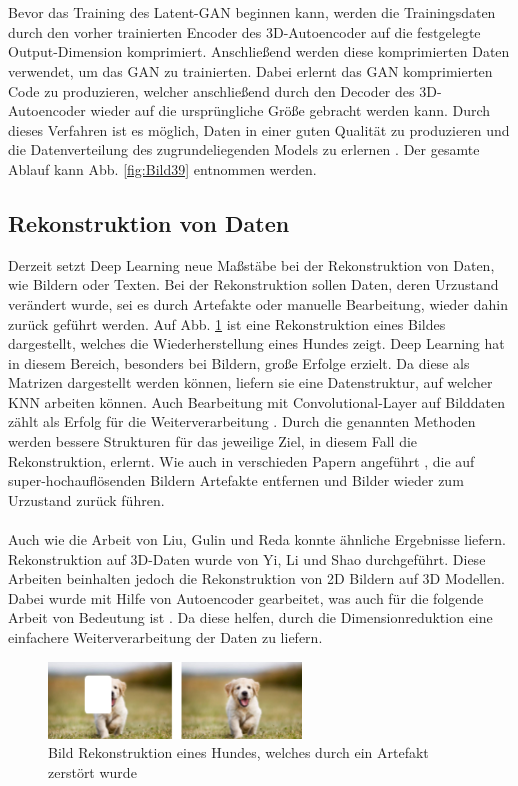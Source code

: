 \documentclass{llncs}
\begin{document}
\\\\
Bevor das Training des Latent-GAN beginnen kann, werden die Trainingsdaten durch den vorher trainierten Encoder des 3D-Autoencoder auf die festgelegte Output-Dimension komprimiert. Anschließend werden diese komprimierten Daten verwendet, um das GAN zu trainierten. Dabei erlernt das GAN komprimierten Code zu produzieren, welcher anschließend durch den Decoder des 3D-Autoencoder wieder auf die ursprüngliche Größe gebracht werden kann. Durch dieses Verfahren ist es möglich, Daten in einer guten Qualität zu produzieren und die Datenverteilung des zugrundeliegenden Models zu erlernen \cite{3dgan}. Der gesamte Ablauf kann Abb. \ref{fig:Bild39} entnommen werden. 

\subsection{Rekonstruktion von Daten}\label{sec:rekdaten}

Derzeit setzt Deep Learning neue Maßstäbe bei der Rekonstruktion von Daten, wie Bildern oder Texten. Bei der Rekonstruktion sollen Daten, deren Urzustand verändert wurde, sei es durch Artefakte oder manuelle Bearbeitung, wieder dahin zurück geführt werden. Auf Abb. \ref{fig:Bild40} ist eine Rekonstruktion eines Bildes dargestellt, welches die Wiederherstellung eines Hundes zeigt. Deep Learning hat in diesem Bereich, besonders bei Bildern, große Erfolge erzielt. Da diese als Matrizen dargestellt werden können, liefern sie eine Datenstruktur, auf welcher KNN arbeiten können. Auch Bearbeitung mit Convolutional-Layer auf Bilddaten zählt als Erfolg für die Weiterverarbeitung \cite{imagerecon}. Durch die genannten Methoden werden bessere Strukturen für das jeweilige Ziel, in diesem Fall die Rekonstruktion, erlernt. Wie auch in verschieden Papern angeführt \cite{imagere1},  die auf super-hochauflösenden Bildern Artefakte entfernen und Bilder wieder zum Urzustand zurück führen.
\\\\
Auch wie die Arbeit von Liu, Gulin und Reda \cite{imagere2} konnte ähnliche Ergebnisse liefern. Rekonstruktion auf 3D-Daten wurde von Yi, Li und Shao \cite{3d_recon} durchgeführt. Diese Arbeiten beinhalten jedoch die Rekonstruktion von 2D Bildern auf 3D Modellen. Dabei wurde mit Hilfe von Autoencoder gearbeitet, was auch für die folgende Arbeit von Bedeutung ist \cite{3d_recon}. Da diese helfen, durch die Dimensionreduktion eine einfachere Weiterverarbeitung der Daten zu liefern.
\begin{figure}[htbp] 
	\centering
	\includegraphics[width=0.6\textwidth]{imagere.png}
	\caption{Bild Rekonstruktion eines Hundes, welches durch ein Artefakt zerstört wurde}
	\label{fig:Bild40}
\end{figure}
\newpage
\end{document}
